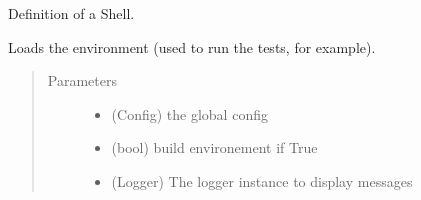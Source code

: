 \documentclass[a4paper,10pt,english]{sphinxmanual}
\begin{document}

\begin{fulllineitems}
\label{\detokenize{apidoc_src/src:src.environment.Shell}}
Definition of a Shell.

\end{fulllineitems}


\begin{fulllineitems}
\label{\detokenize{apidoc_src/src:src.environment.load_environment}}
Loads the environment (used to run the tests, for example).
\begin{quote}\begin{description}
\item[{Parameters}] \leavevmode\begin{itemize}
\item {} 
 \textendash{} (Config) the global config

\item {} 
 \textendash{} (bool) build environement if True

\item {} 
 \textendash{} (Logger) The logger instance to display messages

\end{itemize}

\end{description}\end{quote}

\end{fulllineitems}
\end{document}

